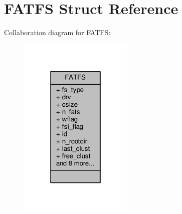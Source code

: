 \hypertarget{structFATFS}{\section{F\+A\+T\+F\+S Struct Reference}
\label{structFATFS}
}


Collaboration diagram for F\+A\+T\+F\+S\+:
\nopagebreak
\begin{figure}[H]
\begin{center}
\leavevmode
\includegraphics[width=154pt]{structFATFS__coll__graph}
\end{center}
\end{figure}
